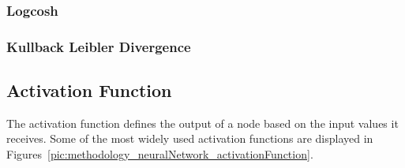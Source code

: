 \subsubsection{Logcosh}

\subsubsection{Kullback Leibler Divergence}

\subsection{Activation Function}
The activation function defines the output of a node based on the input values it receives. Some of the most widely used activation functions are displayed in Figures~\ref{pic:methodology_neuralNetwork_activationFunction}.


